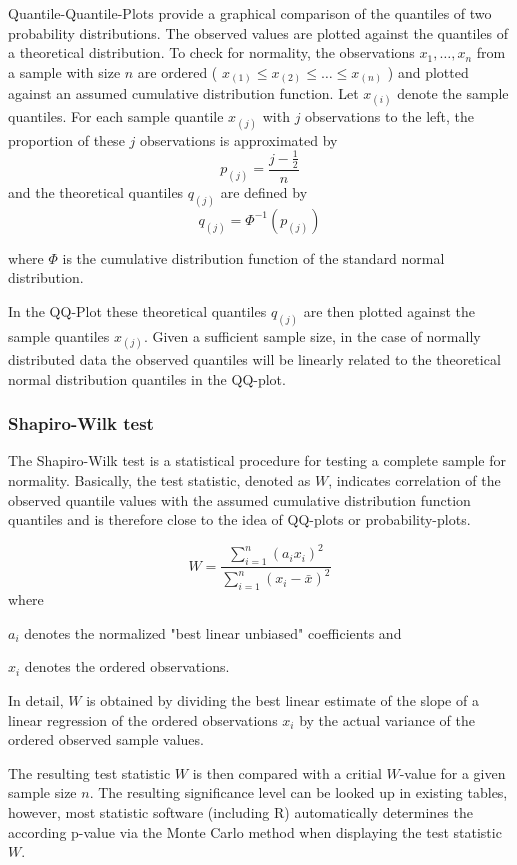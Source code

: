 \documentclass[a4paper, 12pt, titlepage, headsepline, listof = totoc, bibliography = totoc, numbers = noenddot]{scrartcl}
\begin{document}
Quantile-Quantile-Plots provide a graphical comparison of the quantiles of two probability distributions. The observed values are plotted against the quantiles of a theoretical distribution. To check for normality, the observations $x_1, \dots, x_n$ from a sample with size $n$ are ordered ( $x_{(1)} \le x_{(2)} \le \dots \le x_{(n)}$ ) and plotted against an assumed cumulative distribution function. Let $x_{(i)}$ denote the sample quantiles. For each sample quantile $x_{(j)}$ with $j$ observations to the left, the proportion of these $j$ observations is approximated by
\[ p_{(j)} = \frac{j - \frac{1}{2}} {n}\]
and the theoretical quantiles $q_{(j)}$ are defined by
\[ q_{(j)} = \Phi^{-1}(p_{(j)}) \]

where $\Phi$ is the cumulative distribution function of the standard normal distribution.

In the QQ-Plot these theoretical quantiles $q_{(j)}$ are then plotted against the sample quantiles $x_{(j)}$. Given a sufficient sample size, in the case of normally distributed data the observed quantiles will be linearly related to the theoretical normal distribution quantiles in the QQ-plot.

\subsubsection{Shapiro-Wilk test}\label{sec:shapiro-theoretical}

The Shapiro-Wilk test is a statistical procedure for testing a complete sample for normality. Basically, the test statistic, denoted as $W$, indicates correlation of the observed quantile values with the assumed cumulative distribution function quantiles and is therefore close to the idea of QQ-plots or probability-plots. 

\[ W = \frac{\sum \limits_{i=1}^n (a_i x_i)^2} {\sum \limits_{i=1}^n (x_i-\bar{x})^2}\]
where

$a_i$ denotes the normalized "best linear unbiased" coefficients and

$x_i$ denotes the ordered observations.

In detail, $W$ is obtained by dividing the best linear estimate of the slope of a linear regression of the ordered observations $x_i$ by the actual variance of the ordered observed sample values.

The resulting test statistic $W$ is then compared with a critial $W$-value for a given sample size $n$. The resulting significance level can be looked up in existing tables, however, most statistic software (including R) automatically determines the according p-value via the Monte Carlo method when displaying the test statistic $W$.
\end{document}
